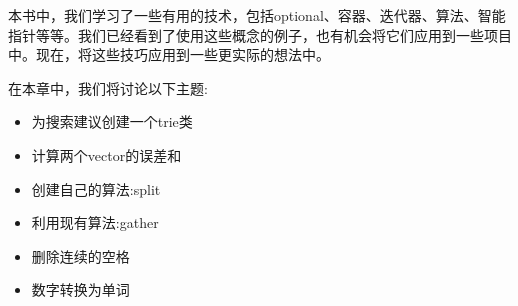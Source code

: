本书中，我们学习了一些有用的技术，包括optional、容器、迭代器、算法、智能指针等等。我们已经看到了使用这些概念的例子，也有机会将它们应用到一些项目中。现在，将这些技巧应用到一些更实际的想法中。

在本章中，我们将讨论以下主题:

\begin{itemize}
\item 
为搜索建议创建一个trie类

\item 
计算两个vector的误差和

\item 
创建自己的算法:split

\item 
利用现有算法:gather

\item 
删除连续的空格

\item 
数字转换为单词
\end{itemize}